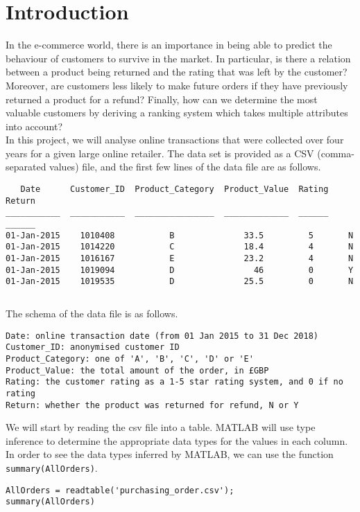 \section{Introduction}
In the e-commerce world, there is an importance in being able to predict the behaviour of customers to survive in the market. In particular, is there a relation between a product being returned and the rating that was left by the customer? Moreover, are customers less likely to make future orders if they have previously returned a product for a refund? Finally, how can we determine the most valuable customers by deriving a ranking system which takes multiple attributes into account? \\

\noindent
In this project, we will analyse online transactions that were collected over four years for a given large online retailer. The data set is provided as a CSV (comma-separated values) file, and the first few lines of the data file are as follows. \\

\begin{lstlisting}
   Date      Customer_ID  Product_Category  Product_Value  Rating  Return
___________  ___________  ________________  _____________  ______  ______
01-Jan-2015    1010408           B              33.5         5       N 
01-Jan-2015    1014220           C              18.4         4       N 
01-Jan-2015    1016167           E              23.2         4       N 
01-Jan-2015    1019094           D                46         0       Y 
01-Jan-2015    1019535           D              25.5         0       N
\end{lstlisting}
$ $

\noindent
The schema of the data file is as follows.
\begin{lstlisting}[language=none]
Date: online transaction date (from 01 Jan 2015 to 31 Dec 2018)
Customer_ID: anonymised customer ID
Product_Category: one of 'A', 'B', 'C', 'D' or 'E'
Product_Value: the total amount of the order, in £GBP
Rating: the customer rating as a 1-5 star rating system, and 0 if no rating
Return: whether the product was returned for refund, N or Y
\end{lstlisting}

\noindent
We will start by reading the csv file into a table. MATLAB will use type inference to determine the appropriate data types for the values in each column. In order to see the data types inferred by MATLAB, we can use the function \lstinline|summary(AllOrders)|.
\begin{lstlisting}
AllOrders = readtable('purchasing_order.csv');
summary(AllOrders)
\end{lstlisting}